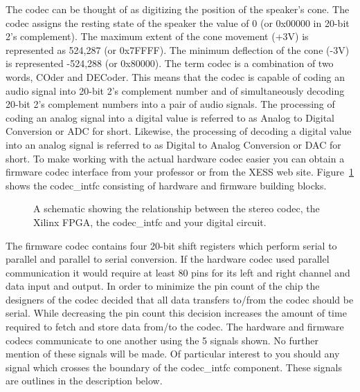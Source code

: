 \begin{enumerate}
The codec can be thought of as digitizing the position of the speaker's
cone.  The codec assigns the resting state of the speaker the value
of 0 (or 0x00000 in 20-bit 2's complement).  The maximum extent of the cone
movement (+3V) is represented as 524,287 (or 0x7FFFF).  The minimum deflection of 
the cone (-3V) is represented -524,288 (or 0x80000).  
 The term codec is a combination of two words, COder
and DECoder.  This means that the codec is capable of coding an audio signal
into 20-bit 2's complement number and of simultaneously decoding 20-bit 2's
complement numbers into a pair of audio signals.   The processing of coding an analog
signal into a digital value is referred to as Analog to Digital Conversion or
ADC for short.  Likewise, the processing of decoding a digital value into an
analog signal is referred to as Digital to Analog Conversion or DAC for short.
To make working with the actual hardware codec easier you can obtain a firmware 
codec interface from your professor or from the XESS web site.  Figure~\ref{fig:codec} 
shows the codec\_intfc consisting of hardware and firmware 
building blocks. 

\begin{figure}[ht]
\caption{A schematic showing the relationship between the stereo codec,
the Xilinx FPGA, the codec\_intfc and your digital circuit.}
\label{fig:codec}
\end{figure}


The firmware codec contains four 20-bit shift registers which perform 
serial to parallel and parallel to serial conversion.  If the hardware
codec used parallel communication it would require at least 80 pins
for its left and right channel and  data input and output.
  In order to minimize the pin count
of the chip the designers of the codec decided that all data transfers
to/from the codec should be serial.  While decreasing the pin count this
decision increases the amount of time required to fetch and store data
from/to the codec.  The hardware and firmware codecs communicate to
one another using the 5 signals shown.  No further mention of these 
signals will be made.  Of particular interest to you should any signal
which crosses the boundary of the codec\_intfc component.  These
signals are outlines in the description below.


\end{enumerate}
